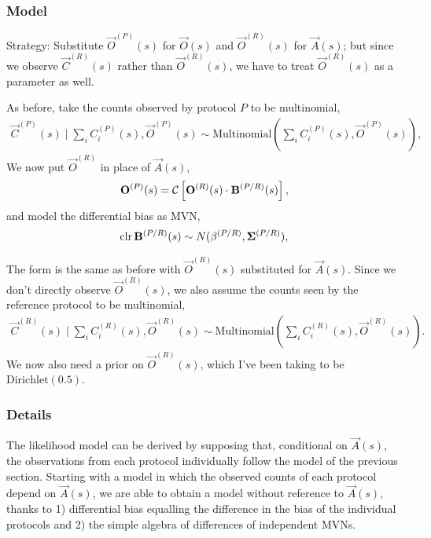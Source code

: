 \subsubsection{Model}

Strategy: Substitute $\vec O^{(P)}(s)$ for $\vec O(s)$ and $\vec O^{(R)}(s)$
for $\vec A(s)$; but since we observe $\vec C^{(R)}(s)$ rather than $\vec
O^{(R)}(s)$, we have to treat $\vec O^{(R)}(s)$ as a parameter as well.

As before, take the counts observed by protocol $P$ to be multinomial,
\begin{align}
  \label{eq:C-P}
  \vec C^{(P)}(s) \mid \sum_i C^{(P)}_i(s), \vec O^{(P)}(s) 
  \sim \mathrm{Multinomial}\left(\sum_i C^{(P)}_i(s), \vec O^{(P)}(s) \right),
\end{align}
We now put $\vec O^{(R)}$ in place of $\vec A(s)$,
\begin{align}
    \label{eq:O-P}
    \mathbf{O}^{(P)}(s) = \operatorname{\mathcal{C}}\left[ \mathbf{O}^{(R)}(s) \cdot \mathbf{B}^{(P/R)}(s) \right],
\end{align}
and model the differential bias as MVN,
\begin{align}
  \label{eq:distn-clrB-PR}
  \operatorname{clr} \mathbf{B}^{(P/R)}(s) \sim N(\mathbf{\beta}^{(P/R)}, \mathbf{\Sigma}^{(P/R)}),
\end{align}

The form is the same as before with $\vec O^{(R)}(s)$ substituted for $\vec
A(s)$. Since we don't directly observe $\vec O^{(R)}(s)$, we also assume the
counts seen by the reference protocol to be multinomial,
\begin{align}
  \label{eq:C-R}
  \vec C^{(R)}(s) \mid \sum_i C^{(R)}_i(s), \vec O^{(R)}(s) 
  \sim \mathrm{Multinomial}\left(\sum_i C^{(R)}_i(s), \vec O^{(R)}(s) \right).
\end{align}
We now also need a prior on $\vec O^{(R)}(s)$, which I've been taking to be
$\mathrm{Dirichlet}(0.5)$.

\subsubsection{Details}

The likelihood model can be derived by supposing that, conditional on $\vec
A(s)$, the observations from each protocol individually follow the model of the
previous section. Starting with a model in which the observed counts of each
protocol depend on $\vec A(s)$, we are able to obtain a model without reference
to $\vec A(s)$, thanks to 1) differential bias equalling the difference in the
bias of the individual protocols and 2) the simple algebra of differences of
independent MVNs.

